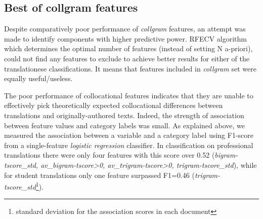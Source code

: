 \subsection{\label{ssec:best_collgram}Best of collgram features} 

Despite comparatively poor performance of \textit{collgram} features, an attempt was made to identify components with higher predictive power. \gls{RFECV} algorithm which determines the optimal number of features (instead of setting N a-priori), could not find any features to exclude to achieve better results for either of the translationese classifications. It means that features included in \textit{collgram} set were equally useful/useless. 



%

%
The poor performance of collocational features indicates that they are unable to effectively pick theoretically expected collocational differences between translations and originally-authored texts. Indeed, the strength of association between feature values and category labels was small. As explained above, we measured the association between a variable and a category label using F1-score from a single-feature \textit{logistic regression} classifier. 
In classification on professional translations there were only four features with this score over 0.52 (\textit{bigram-tscore\_std, av\_bigram-tscore>0, av\_trigram-tscore>0, trigram-tscore\_std}), while for student translations only one feature surpassed F1=0.46 (\textit{trigram-tscore\_std}\footnote{standard deviation for the association scores in each document}). 


